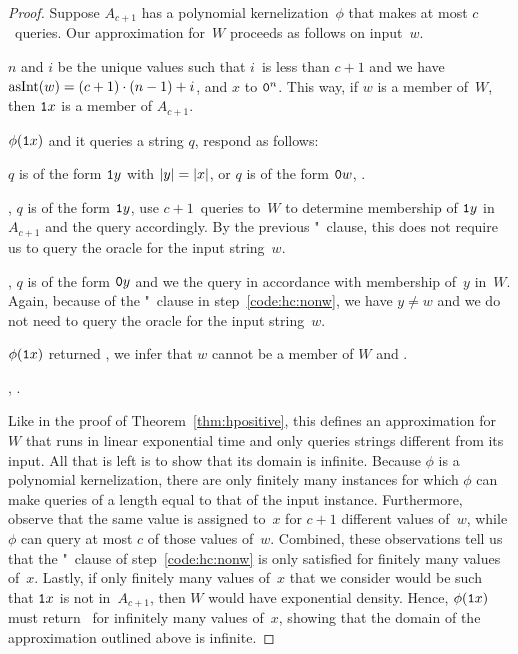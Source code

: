 \begin{proof}
  Suppose $A_{c + 1}$ has a polynomial kernelization~$\phi$ that makes at most $c$~queries.
  Our approximation for~$W$ proceeds as follows on input~$w$.
  \begin{codelisting}
  \item
     $n$ and $i$ be the unique values such that $i$~is less than $c + 1$ and we have $\asNat(w) = (c + 1) \cdot (n - 1) + i$, and  $x$ to $\bits{0}^n$.
    This way, if $w$ is a member of~$W$, then $\bits{1}x$ is a member of $A_{c + 1}$.
  \item
     $\phi(\bits{1}x)$ and  it queries a string $q$, respond as follows:
    \begin{codelisting}
    \item\label{code:hc:nonw}%
       $q$ is of the form $\bits{1}y$ with $\length{y} = \length{x}$, or  $q$ is of the form $\bits{0}w$,  .
    \item
      ,  $q$ is of the form $\bits{1}y$, use $c + 1$~queries to~$W$ to determine membership of $\bits{1}y$ in~$A_{c + 1}$ and  the query accordingly.
      By the previous "~clause, this does not require us to query the oracle for the input string~$w$.
    \item
      , $q$ is of the form $\bits{0}y$ and we  the query in accordance with membership of~$y$ in~$W$.
      Again, because of the "~clause in step~\ref{code:hc:nonw}, we have $y \neq w$ and we do not need to query the oracle for the input string~$w$.
    \end{codelisting}
  \item
     $\phi(\textnormal{\texttt{1}}x)$ returned , we infer that $w$ cannot be a member of $W$ and  .
  \item
    ,  .
  \end{codelisting}
  Like in the proof of Theorem~\ref{thm:hpositive}, this defines an approximation for~$W$ that runs in linear exponential time and only queries strings different from its input.
  All that is left is to show that its domain is infinite.
  Because $\phi$ is a polynomial kernelization, there are only finitely many instances for which $\phi$ can make queries of a length equal to that of the input instance.
  Furthermore, observe that the same value is assigned to~$x$ for $c + 1$ different values of~$w$, while $\phi$ can query at most $c$ of those values of~$w$.
  Combined, these observations tell us that the "~clause of step~\ref{code:hc:nonw} is only satisfied for finitely many values of~$x$.
  Lastly, if only finitely many values of~$x$ that we consider would be such that $\textnormal{\texttt{1}}x$ is not in~$A_{c + 1}$, then $W$ would have exponential density.
  Hence, $\phi(\textnormal{\texttt{1}}x)$ must return~ for infinitely many values of~$x$, showing that the domain of the approximation outlined above is infinite.
\end{proof}

